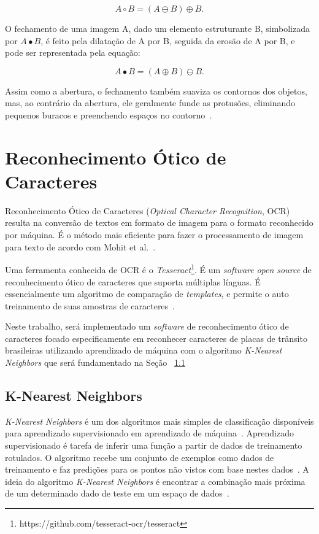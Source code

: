 \begin{displaymath}
A \circ B = (A \ominus B)\oplus B. 
\end{displaymath}

O fechamento de uma imagem A, dado um elemento estruturante B, simbolizada por $A \bullet B$, é feito pela dilatação de A por B, seguida da erosão de A por B, e pode ser representada pela equação:

\begin{displaymath}
A \bullet B = (A \oplus B)\ominus B. 
\end{displaymath}

Assim como a abertura, o fechamento também suaviza os contornos dos objetos, mas, ao contrário da abertura, ele geralmente funde  as protusões, eliminando pequenos buracos e preenchendo espaços no contorno~\cite{gonzalez1977digital}.

\section{Reconhecimento Ótico de Caracteres}
\label{sec:ocr}

Reconhecimento Ótico de Caracteres (\emph{Optical Character Recognition}, OCR)
resulta na conversão de textos em formato de imagem para o formato reconhecido por máquina. É o método mais eficiente para fazer o processamento de imagem para texto de acordo com Mohit et al.~\cite{mohit2015designing}.

Uma ferramenta conhecida de OCR é o
\emph{Tesseract}\footnote{https://github.com/tesseract-ocr/tesseract}. É um \emph{software} \emph{open source} de reconhecimento ótico de caracteres que suporta múltiplas línguas.  É essencialmente um algoritmo de comparação de \emph{templates}, e permite o auto treinamento de suas amostras de caracteres~\cite{ho2016intelligent}.

Neste trabalho, será implementado um \emph{software} de reconhecimento ótico de caracteres focado especificamente em reconhecer caracteres de placas de trânsito brasileiras utilizando aprendizado de máquina com o algoritmo \emph{K-Nearest Neighbors} que será fundamentado na Seção ~\ref{sec:knearest}

\subsection{K-Nearest Neighbors}
\label{sec:knearest}

\emph{K-Nearest Neighbors} é um dos algoritmos mais simples de classificação disponíveis para aprendizado supervisionado em aprendizado de máquina~\cite{opencv2014knearest}. Aprendizado supervisionado é tarefa de inferir uma função a partir de dados de treinamento rotulados. O algoritmo recebe um conjunto de exemplos como dados de treinamento e faz predições para os pontos não vistos com base nestes dados~\cite{mohri2012foundations}. A ideia do algoritmo \emph{K-Nearest Neighbors} é encontrar a combinação mais próxima de um determinado dado de teste em um espaço de dados~\cite{opencv2014knearest}.

